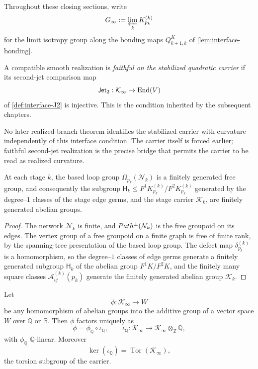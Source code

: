 Throughout these closing sections, write
\[
	G_\infty:=\varprojlim_k K_{p_k}^{(k)}
\]
for the limit isotropy group along the bonding maps
\(Q_{k+1,k}^{K}\) of \cref{lem:interface-bonding}.
\begin{definition}
	\label{def:second-jet-faithfulness}
	A compatible smooth realization is \emph{faithful on the stabilized
		quadratic carrier} if its second-jet comparison map
	\[
		\mathsf{Jet}_2:\mathcal K_\infty\to \mathrm{End}(V)
	\]
	of \cref{def:interface-J2} is injective.  This is the condition
	inherited by the subsequent chapters.
\end{definition}
No later realized-branch theorem identifies the stabilized carrier with
curvature independently of this interface condition.  The carrier itself
is forced earlier; faithful second-jet realization is the precise bridge
that permits the carrier to be read as realized curvature.
\begin{lemma}
	\label{lem:transport-fg}
	At each stage \(k\), the based loop group
	\(\Omega_{p_k}(\mathcal N_k)\) is a finitely generated free group, and
	consequently the subgroup
	\(\mathsf H_k\le F^1K_{p_k}^{(k)}/F^2K_{p_k}^{(k)}\)
	generated by the degree--\(1\) classes of the stage edge germs, and
	the stage carrier \(\mathcal K_k\), are finitely generated abelian
	groups.
\end{lemma}
\begin{proof}
	The network \(\mathcal N_k\) is finite, and
	\(Path^\pm(\mathcal N_k)\) is the free groupoid on its edges.  The
	vertex group of a free groupoid on a finite graph is free of finite
	rank, by the spanning-tree presentation of the based loop group.
	The defect map \(\delta_{p_k}^{(k)}\) is a homomorphism, so the
	degree--\(1\) classes of edge germs generate a finitely generated
	subgroup \(\mathsf H_k\) of the abelian group \(F^1K/F^2K\), and the
	finitely many square classes \(\mathcal A_{ij}^{(k)}(p_k)\) generate
	the finitely generated abelian group \(\mathcal K_k\).
\end{proof}
\begin{lemma}
	\label{lem:real-factorization}
	Let
	\[
		\phi:\mathcal K_\infty\to W
	\]
	be any homomorphism of abelian groups into the additive group of a
	vector space \(W\) over \(\mathbb Q\) or \(\mathbb R\).  Then \(\phi\)
	factors uniquely as
	\[
		\phi=\phi_{\mathbb Q}\circ\iota_{\mathbb Q},
		\qquad
		\iota_{\mathbb Q}:\mathcal K_\infty\to\mathcal K_\infty\otimes_{\mathbb Z}\mathbb Q,
	\]
	with \(\phi_{\mathbb Q}\) \(\mathbb Q\)-linear.  Moreover
	\[
		\ker(\iota_{\mathbb Q})
		=
		\operatorname{Tor}(\mathcal K_\infty),
	\]
	the torsion subgroup of the carrier.
\end{lemma}
